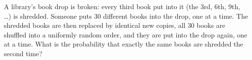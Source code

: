 A library's book drop is broken: every third book put into it (the $3$rd, $6$th, $9$th, \dots) is shredded. Someone puts $30$ different books into the drop, one at a time. The shredded books are then replaced by identical new copies, all $30$ books are shuffled into a uniformly random order, and they are put into the drop again, one at a time. What is the probability that exactly the same books are shredded the second time?
